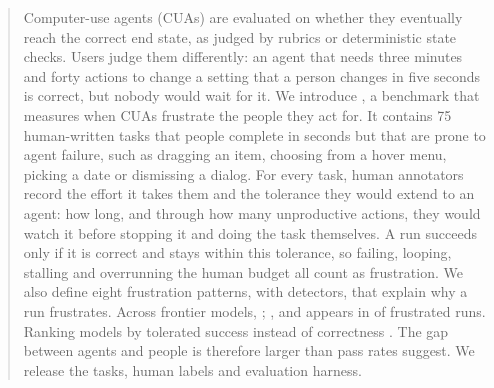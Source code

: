 \begin{abstract}
Computer-use agents (CUAs) are evaluated on whether they eventually reach the correct end state, as judged by rubrics or deterministic state checks. Users judge them differently: an agent that needs three minutes and forty actions to change a setting that a person changes in five seconds is correct, but nobody would wait for it. We introduce \bench, a benchmark that measures when CUAs frustrate the people they act for. It contains 75 human-written tasks that people complete in seconds but that are prone to agent failure, such as dragging an item, choosing from a hover menu, picking a date or dismissing a dialog. For every task, human annotators record the effort it takes them and the tolerance they would extend to an agent: how long, and through how many unproductive actions, they would watch it before stopping it and doing the task themselves. A run succeeds only if it is correct and stays within this tolerance, so failing, looping, stalling and overrunning the human budget all count as frustration. We also define eight frustration patterns, with detectors, that explain why a run frustrates. Across  frontier models, ; , and  appears in  of frustrated runs. Ranking models by tolerated success instead of correctness . The gap between agents and people is therefore larger than pass rates suggest. We release the tasks, human labels and evaluation harness.
\end{abstract}
